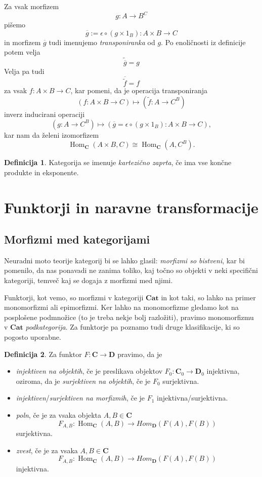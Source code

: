 \documentclass[12pt,a4paper]{book}
\theoremstyle{definition}
\newtheorem{definicija}{Definicija}[chapter]
\theoremstyle{plain}
\theoremstyle{definition}
\theoremstyle{remark}
\newcommand{\cat}[1]{\textbf{#1}}
\DeclareMathOperator{\Hom}{Hom}
\begin{document}
Za vsak morfizem $$g : A \to B^C$$ pišemo
$$ \overline{g} := \epsilon \circ (g \times 1_B) : A \times B \to C$$
in morfizem $\overline{g}$ tudi imenujemo \emph{transponiranka} od $g$. Po enoličnosti iz definicije potem velja
$$\widetilde{\overline{g}} = g$$
Velja pa tudi
$$\overline{\widetilde{f}} = f$$
za vsak $f : A \times B \to C$, kar pomeni, da je operacija transponiranja
$$(f : A \times B \to C) \mapsto (\widetilde{f} : A \to C^B)$$
inverz inducirani operaciji
$$(g : A \to C^B) \mapsto (\overline{g} = \epsilon \circ (g \times 1_B) : A \times B \to C),$$
kar nam da želeni izomorfizem
$$\Hom_{\cat{C}}(A \times B, C) \cong \Hom_{\cat{C}}(A, C^B).$$

\begin{definicija}
Kategorija se imenuje \emph{kartezično zaprta}, če ima vse končne produkte in eksponente.
\end{definicija}

\section{Funktorji in naravne transformacije}

\subsection{Morfizmi med kategorijami}

Neuradni moto teorije kategorij bi se lahko glasil: \emph{morfizmi so bistveni},
kar bi pomenilo, da nas ponavadi ne zanima toliko, kaj točno so objekti v neki specifični kategoriji, temveč kaj se dogaja z morfizmi med njimi.

Funktorji, kot vemo, so morfizmi v kategoriji $\cat{Cat}$ in kot taki, so lahko na primer monomorfizmi ali epimorfizmi. Ker lahko na monomorfizme gledamo kot na posplošene podmnožice (to je treba nekje bolj razložiti), pravimo monomorfizmu v $\cat{Cat}$ \emph{podkategorija}. Za funktorje pa poznamo tudi druge klasifikacije, ki so pogosto uporabne.

\begin{definicija}
Za funktor $F : \cat{C} \to \cat{D}$ pravimo, da je 
\begin{itemize}
\item \emph{injektiven na objektih}, če je preslikava objektov $F_0 : \cat{C}_0 \to \cat{D}_0$ injektivna, oziroma, da je \emph{surjektiven na objektih}, če je $F_0$ surjektivna.
\item \emph{injektiven}/\emph{surjektiven na morfizmih}, če je $F_1$ injektivna/surjektivna.
\item \emph{poln}, če je za vsaka objekta $A,B \in \cat{C}$
$$F_{A,B} : \Hom_{\cat{C}}(A,B) \to Hom_{\cat{D}}(F(A),F(B))$$
surjektivna.
\item \emph{zvest}, če je za vsaka $A,B \in \cat{C}$
$$F_{A,B} : \Hom_{\cat{C}}(A,B) \to Hom_{\cat{D}}(F(A),F(B))$$
injektivna.
\end{itemize}
\end{definicija}
\end{document}
